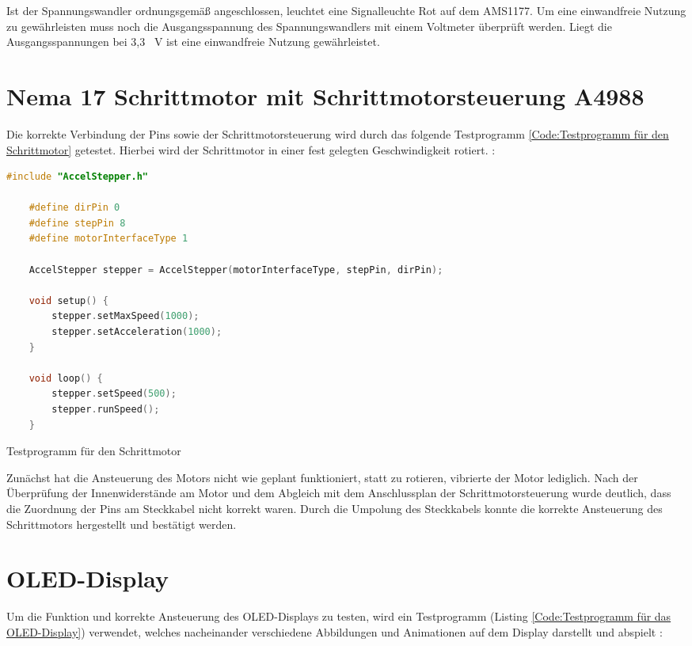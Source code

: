 Ist der Spannungswandler ordnungsgemäß angeschlossen, leuchtet eine Signalleuchte Rot auf dem AMS1177. Um eine einwandfreie Nutzung zu gewährleisten muss noch die Ausgangsspannung des Spannungswandlers mit einem Voltmeter überprüft werden. Liegt die Ausgangsspannungen bei 3,3 \ V ist eine einwandfreie Nutzung gewährleistet. 


\section{ Nema 17 Schrittmotor mit Schrittmotorsteuerung A4988 }

Die korrekte Verbindung der Pins sowie der Schrittmotorsteuerung wird durch das folgende Testprogramm \ref{Code:Testprogramm für den Schrittmotor} getestet. Hierbei wird der Schrittmotor in einer fest gelegten Geschwindigkeit rotiert. \cite{MikeMcCauley.2024}:

\begin{code}[H]
	\begin{lstlisting}[language=c++]
	#include "AccelStepper.h"
	
	#define dirPin 0
	#define stepPin 8
	#define motorInterfaceType 1
	
	AccelStepper stepper = AccelStepper(motorInterfaceType, stepPin, dirPin);
	
	void setup() {
		stepper.setMaxSpeed(1000);
		stepper.setAcceleration(1000);
	}
	
	void loop() {
		stepper.setSpeed(500);
		stepper.runSpeed();
	}
\end{lstlisting}      

\caption[Testprogramm für den Schrittmotor]{Testprogramm für den Schrittmotor}\label{Code:Testprogramm für den Schrittmotor}    
\end{code} 

Zunächst hat die Ansteuerung des Motors nicht wie geplant funktioniert, statt zu rotieren, vibrierte der Motor lediglich. Nach der Überprüfung der Innenwiderstände am Motor und dem Abgleich mit dem Anschlussplan der Schrittmotorsteuerung wurde deutlich, dass die Zuordnung der Pins am Steckkabel nicht korrekt waren. Durch die Umpolung des Steckkabels konnte die korrekte Ansteuerung des Schrittmotors hergestellt und bestätigt werden.

\section{OLED-Display}

Um die Funktion und korrekte Ansteuerung des OLED-Displays zu testen, wird ein Testprogramm (Listing \ref{Code:Testprogramm für das OLED-Display}) verwendet, welches nacheinander verschiedene Abbildungen und Animationen auf dem Display darstellt und abspielt \cite{RuiSantos.2016}:


